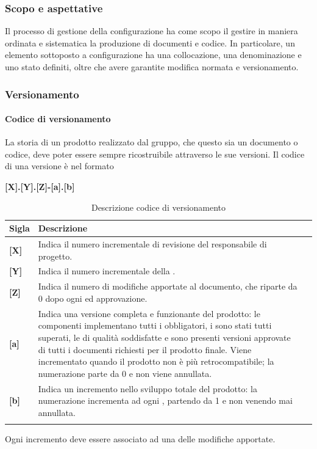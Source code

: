 {{\subsubsection{Scopo e aspettative}
Il processo di gestione della configurazione ha come scopo il gestire in maniera ordinata e sistematica la produzione di documenti e codice. In particolare, un elemento sottoposto a configurazione ha una collocazione, una denominazione e uno stato definiti, oltre che avere garantite modifica normata e versionamento. 
\subsubsection{Versionamento}
\paragraph*{Codice di versionamento}
\label{cod-versionamento}
La storia di un prodotto realizzato dal gruppo, che questo sia un documento o codice, deve poter essere sempre ricostruibile attraverso le sue versioni. Il codice di una versione è nel formato\newline
\centerline{\textbf{[X].[Y].[Z]-[a].[b]}}\newline{}
\newpage{}
\setlength{\freewidth}{\dimexpr\textwidth-0\tabcolsep}
	\renewcommand{\arraystretch}{1.5}
	\setlength{\aboverulesep}{0pt}
	\setlength{\belowrulesep}{0pt}
	\begin{longtable}{L{.210\freewidth} L{.6\freewidth} L{.080\freewidth}}
		\textbf{Sigla} & \textbf{Descrizione} \\
		\toprule
		\endhead
		\textbf{[X]} & Indica il numero incrementale di revisione del responsabile di progetto. \\
		\textbf{[Y]} & Indica il numero incrementale della . \\
		\textbf{[Z]} & Indica il numero di modifiche apportate al documento, che riparte da 0 dopo ogni  ed approvazione. \\
		\textbf{[a]} & Indica una versione completa e funzionante del prodotto: le componenti  implementano tutti i  obbligatori, i  sono stati tutti superati, le  di qualità soddisfatte e sono presenti versioni approvate di tutti i documenti richiesti per il prodotto finale. Viene incrementato quando il prodotto  non è più retrocompatibile; la numerazione parte da 0 e non viene annullata. \\
		\textbf{[b]} & Indica un incremento nello sviluppo totale del prodotto: la numerazione incrementa ad ogni , partendo da 1 e non venendo mai annullata. \\
		\bottomrule
		\hiderowcolors
		\caption{Descrizione codice di versionamento}
	\end{longtable}
Ogni incremento deve essere associato ad una  delle modifiche apportate.
}}
